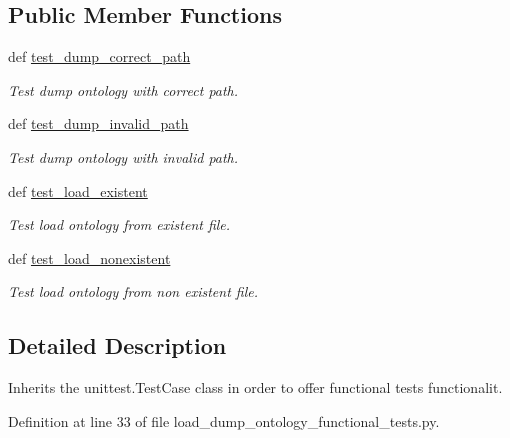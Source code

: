 \subsection*{Public Member Functions}
\begin{DoxyCompactItemize}
\item 
def \hyperlink{classload__dump__ontology__functional__tests_1_1OntologyFunc_ad50d52bac563582e9052c61a9a9d5196}{test\-\_\-dump\-\_\-correct\-\_\-path}
\begin{DoxyCompactList}\small\item\em Test dump ontology with correct path. \end{DoxyCompactList}\item 
def \hyperlink{classload__dump__ontology__functional__tests_1_1OntologyFunc_a208ccc161865a0fc32bfc3c1af7d27a0}{test\-\_\-dump\-\_\-invalid\-\_\-path}
\begin{DoxyCompactList}\small\item\em Test dump ontology with invalid path. \end{DoxyCompactList}\item 
def \hyperlink{classload__dump__ontology__functional__tests_1_1OntologyFunc_a598f0f8220f6d038667c0ab4f29ed851}{test\-\_\-load\-\_\-existent}
\begin{DoxyCompactList}\small\item\em Test load ontology from existent file. \end{DoxyCompactList}\item 
def \hyperlink{classload__dump__ontology__functional__tests_1_1OntologyFunc_a8642dbfe9f5b4b7ebd0a4ab5b52c605c}{test\-\_\-load\-\_\-nonexistent}
\begin{DoxyCompactList}\small\item\em Test load ontology from non existent file. \end{DoxyCompactList}\end{DoxyCompactItemize}


\subsection{Detailed Description}
Inherits the unittest.\-Test\-Case class in order to offer functional tests functionalit. 

Definition at line 33 of file load\-\_\-dump\-\_\-ontology\-\_\-functional\-\_\-tests.\-py.



